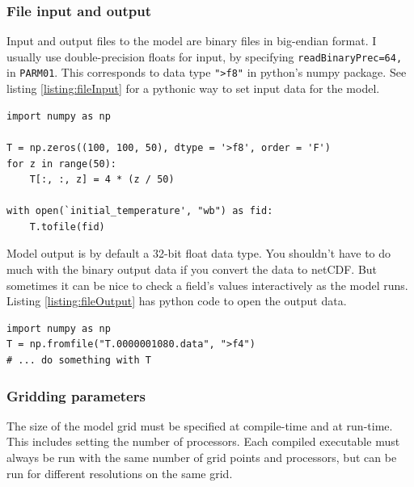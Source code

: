 \documentclass[11pt]{article}
\begin{document}
\subsubsection{File input and output}
Input and output files to the model are binary files in big-endian format. I usually use double-precision floats for input, by specifying \verb|readBinaryPrec=64,| in \verb|PARM01|. This corresponds to data type \verb|">f8"| in python's numpy package. See listing \ref{listing:fileInput} for a pythonic way to set input data for the model.

\begin{lstlisting}[caption={Python code for making input files to MITgcm}, label=listing:fileInput]
import numpy as np

T = np.zeros((100, 100, 50), dtype = '>f8', order = 'F')
for z in range(50):
	T[:, :, z] = 4 * (z / 50)

with open(`initial_temperature', "wb") as fid:
	T.tofile(fid)
\end{lstlisting}

Model output is by default a 32-bit float data type. You shouldn't have to do much with the binary output data if you convert the data to netCDF. But sometimes it can be nice to check a field's values interactively as the model runs. Listing \ref{listing:fileOutput} has python code to open the output data.

\begin{lstlisting}[caption={Python code for opening MITgcm binary output files}, label=listing:fileOutput]
import numpy as np
T = np.fromfile("T.0000001080.data", ">f4")
# ... do something with T
\end{lstlisting}

\subsubsection{Gridding parameters}
The size of the model grid must be specified at compile-time and at run-time. This includes setting the number of processors. Each compiled executable must always be run with the same number of grid points and processors, but can be run for different resolutions on the same grid.
\end{document}
